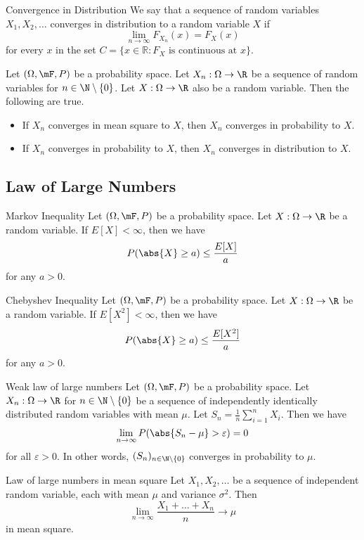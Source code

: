 \documentclass[a4paper]{article}
\begin{document}
\begin{defn}{Convergence in Distribution}{} We say that a sequence of random variables $X_1,X_2,\dots$ converges in distribution to a random variable $X$ if $$\lim_{n\to\infty}F_{X_n}(x)=F_X(x)$$ for every $x$ in the set $C=\{x\in\mathbb{R}:F_X\text{ is continuous at } x\}$. 
\end{defn}

\begin{prp}{}{} Let $(\Omega,\mF,P)$ be a probability space. Let $X_n:\Omega\to\R$ be a sequence of random variables for $n\in\N\setminus\{0\}$. Let $X:\Omega\to\R$ also be a random variable. Then the following are true. 
\begin{itemize}
\item If $X_n$ converges in mean square to $X$, then $X_n$ converges in probability to $X$. 
\item If $X_n$ converges in probability to $X$, then $X_n$ converges in distribution to $X$. 
\end{itemize}
\end{prp}

\subsection{Law of Large Numbers}
\begin{thm}{Markov Inequality}{} Let $(\Omega,\mF,P)$ be a probability space. Let $X:\Omega\to\R$ be a random variable. If $E[X]<\infty$, then we have $$P(\abs{X}\geq a)\leq\frac{E[X]}{a}$$ for any $a>0$. 
\end{thm}

\begin{thm}{Chebyshev Inequality}{} Let $(\Omega,\mF,P)$ be a probability space. Let $X:\Omega\to\R$ be a random variable. If $E[X^2]<\infty$, then we have $$P(\abs{X}\geq a)\leq\frac{E[X^2]}{a}$$ for any $a>0$. 
\end{thm}

\begin{thm}{Weak law of large numbers}{} Let $(\Omega,\mF,P)$ be a probability space. Let $X_n:\Omega\to\R$ for $n\in\N\setminus\{0\}$ be a sequence of independently identically distributed random variables with mean $\mu$. Let $S_n=\frac{1}{n}\sum_{i=1}^nX_i$. Then we have $$\lim_{n\to\infty}P(\abs{S_n-\mu}>\varepsilon)=0$$ for all $\varepsilon>0$. In other words, $(S_n)_{n\in\N\setminus\{0\}}$ converges in probability to $\mu$. 
\end{thm}

\begin{thm}{Law of large numbers in mean square}{} Let $X_1,X_2,\dots$ be a sequence of independent random variable, each with mean $\mu$ and variance $\sigma^2$. Then $$\lim_{n\to\infty}\frac{X_1+\dots+X_n}{n}\to\mu$$ in mean square. 
\end{thm}
\end{document}
